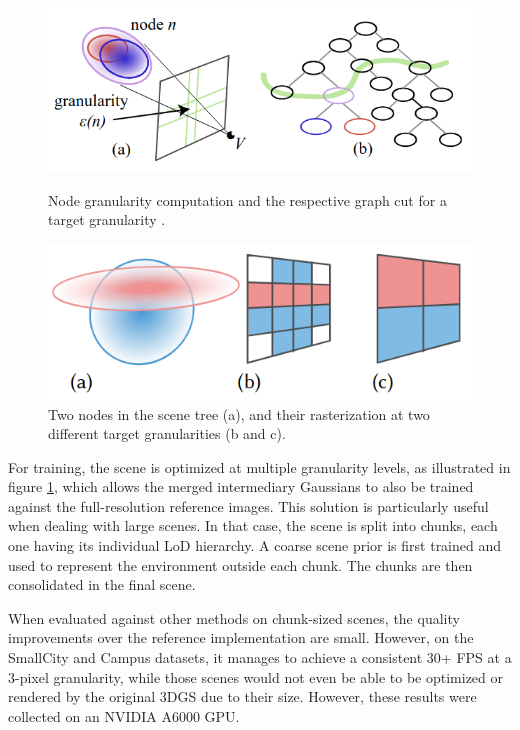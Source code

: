 \begin{figure}[H]
    \centering
    \begin{minipage}{0.45\textwidth}
       \centering
        \includegraphics[width=\linewidth]{figures/inria_granularity.png}
        \caption{Node granularity computation and the respective graph cut for a target granularity \cite{kerbl_hierarchy}.}
        \label{fig:inria_granularity}
    \end{minipage}\hfill
    \begin{minipage}{0.45\textwidth}
        \centering
        \includegraphics[width=\linewidth]{figures/inria_train.png}
        \caption{Two nodes in the scene tree (a), and their rasterization at two different target granularities (b and c).}
        \label{fig:inria_train}
    \end{minipage}
\end{figure}

For training, the scene is optimized at multiple granularity levels, as illustrated in figure \ref{fig:inria_train}, which allows the merged intermediary Gaussians to also be trained against the full-resolution reference images. This solution is particularly useful when dealing with large scenes. In that case, the scene is split into chunks, each one having its individual LoD hierarchy. A coarse scene prior is first trained and used to represent the environment outside each chunk. The chunks are then consolidated in the final scene. 

When evaluated against other methods on chunk-sized scenes, the quality improvements over the reference implementation are small. However, on the SmallCity and Campus datasets, it manages to achieve a consistent 30+ FPS at a 3-pixel granularity, while those scenes would not even be able to be optimized or rendered by the original 3DGS due to their size. However, these results were collected on an NVIDIA A6000 GPU.